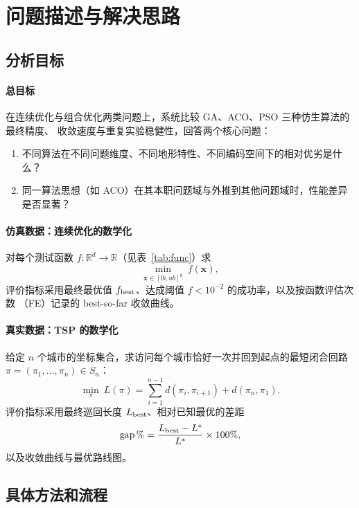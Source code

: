 \documentclass[12pt,a4paper,fontset=windows]{ctexart}
\newcommand{\R}{\mathbb{R}}
\begin{document}
\section{问题描述与解决思路}
\label{sec:formulation}

\subsection{分析目标}

\paragraph{总目标}
在连续优化与组合优化两类问题上，系统比较 GA、ACO、PSO 三种仿生算法的最终精度、
收敛速度与重复实验稳健性，回答两个核心问题：

\begin{enumerate}
  \item 不同算法在不同问题维度、不同地形特性、不同编码空间下的相对优劣是什么？
  \item 同一算法思想（如 ACO）在其本职问题域与外推到其他问题域时，性能差异是否显著？
\end{enumerate}

\paragraph{仿真数据：连续优化的数学化}
对每个测试函数 $f:\R^d\to\R$（见表~\ref{tab:func}）求
\begin{equation}
  \min_{\bm{x}\in[lb,ub]^d}\ f(\bm{x}),
\end{equation}
评价指标采用最终最优值 $f_{\rm best}$、达成阈值 $f<10^{-2}$ 的成功率，以及按函数评估次数
（FE）记录的 best-so-far 收敛曲线。

\paragraph{真实数据：TSP 的数学化}
给定 $n$ 个城市的坐标集合，求访问每个城市恰好一次并回到起点的最短闭合回路
$\pi=(\pi_1,\dots,\pi_n)\in S_n$：
\begin{equation}
  \min_{\pi}\ L(\pi) = \sum_{i=1}^{n-1} d(\pi_i,\pi_{i+1}) + d(\pi_n, \pi_1).
\end{equation}
评价指标采用最终巡回长度 $L_{\rm best}$、相对已知最优的差距
\[
  \mathrm{gap}\,\%=\frac{L_{\rm best}-L^{\ast}}{L^{\ast}}\times 100\%,
\]
以及收敛曲线与最优路线图。

\subsection{具体方法和流程}
\end{document}
